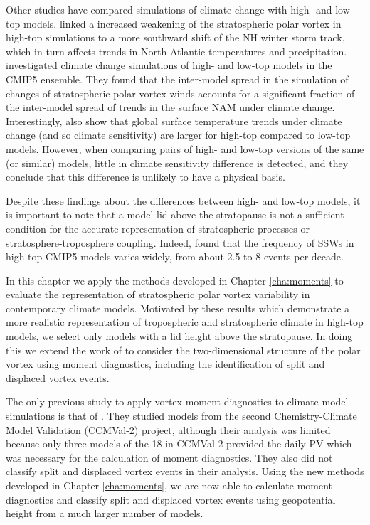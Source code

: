 Other studies have compared simulations of climate change with high- and low-top
models. \citet{Huebener2007} linked a increased weakening of the stratospheric
polar vortex in high-top simulations to a more southward shift of the NH winter
storm track, which in turn affects trends in North Atlantic temperatures and
precipitation. \citet{Manzini2014} investigated climate change simulations of
high- and low-top models in the CMIP5 ensemble. They found that the inter-model
spread in the simulation of changes of stratospheric polar vortex winds accounts
for a significant fraction of the inter-model spread of trends in the surface
NAM under climate change. Interestingly, \citet{Manzini2014} also show that
global surface temperature trends under climate change (and so climate
sensitivity) are larger for high-top compared to low-top models. However, when
comparing pairs of high- and low-top versions of the same (or similar) models,
little in climate sensitivity difference is detected, and they conclude that
this difference is unlikely to have a physical basis.

Despite these findings about the differences between high- and low-top models,
it is important to note that a model lid above the stratopause is not a
sufficient condition for the accurate representation of stratospheric processes
or stratosphere-troposphere coupling. Indeed, \citet{Charlton-Perez2013} found
that the frequency of SSWs in high-top CMIP5 models varies widely, from about
2.5 to 8 events per decade. 

In this chapter we apply the methods developed in Chapter \ref{cha:moments} to
evaluate the representation of stratospheric polar vortex variability in
contemporary climate models. Motivated by these results which demonstrate a more
realistic representation of tropospheric and stratospheric climate in high-top
models, we select only models with a lid height above the stratopause. In doing
this we extend the work of \citet{Charlton-Perez2013} to consider the
two-dimensional structure of the polar vortex using moment diagnostics,
including the identification of split and displaced vortex events.

The only previous study to apply vortex moment diagnostics to climate model
simulations is that of \citet{Mitchell2012a}. They studied models from the
second Chemistry-Climate Model Validation (CCMVal-2) project, although their
analysis was limited because only three models of the 18 in CCMVal-2 provided
the daily PV which was necessary for the calculation of moment diagnostics. They
also did not classify split and displaced vortex events in their analysis. Using
the new methods developed in Chapter \ref{cha:moments}, we are now able to
calculate moment diagnostics and classify split and displaced vortex events
using geopotential height from a much larger number of models.

